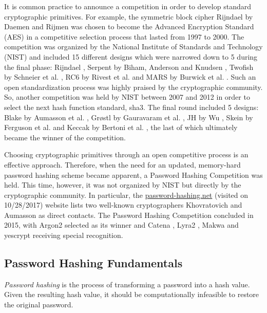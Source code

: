 It is common practice to announce a competition in order to develop standard cryptographic primitives. For example, the symmetric block cipher Rijndael by Daemen and Rijmen \cite{daemen:2002:DRA} was chosen to become the Advanced Encryption Standard (AES) \cite{aes-fips} in a competitive selection process that lasted from 1997 to 2000. The competition was organized by the National Institute of Standards and Technology (NIST) and included 15 different designs which were narrowed down to 5 during the final phase: Rijndael \cite{daemen:2002:DRA}, Serpent by Biham, Anderson and Knudsen \cite{anderson:1988:serpent}, Twofish by Schneier et al. \cite{schneier:1998:twofish}, RC6 by Rivest et al. \cite{rivest:1998:rc6} and MARS by Burwick et al. \cite{burwick:1998:mars}. Such an open standardization process was highly praised by the cryptographic community. So, another competition was held by NIST between 2007 and 2012 in order to select the next hash function standard, \gls{sha3}. The final round included 5 designs: Blake by Aumasson et al. \cite{aumasson:2013:blake2}, Grøstl by Gauravaram et al. \cite{praveen:2011:groestl}, JH by Wu \cite{wu:2011:jh}, Skein by Ferguson et al. \cite{ferguson:2009:skein} and Keccak by Bertoni et al. \cite{cryptoeprint:2015:keccak}, the last of which ultimately became the winner of the competition.

Choosing cryptographic primitives through an open competitive process is an effective approach. Therefore, when the need for an updated, memory-hard password hashing scheme became apparent, a Password Hashing Competition was held. This time, however, it was not organized by NIST but directly by the cryptographic community. In particular, the \url{password-hashing.net} (visited on 10/28/2017) website lists two well-known cryptographers Khovratovich and Aumasson as direct contacts. The Password Hashing Competition concluded in 2015, with Argon2 \cite{biryukov:2015:argon2} selected as its winner and Catena \cite{forler:2013:catena}, Lyra2 \cite{andrade:2016:lyra2}, Makwa \cite{pornin:2015:makwa} and yescrypt \cite{peslyak:2015:yescrypt} receiving special recognition.

\subsection{Password Hashing Fundamentals}
\label{sec:fundamentals}

\emph{Password hashing} is the process of transforming a password into a hash value. Given the resulting hash value, it should be computationally infeasible to restore the original password.

